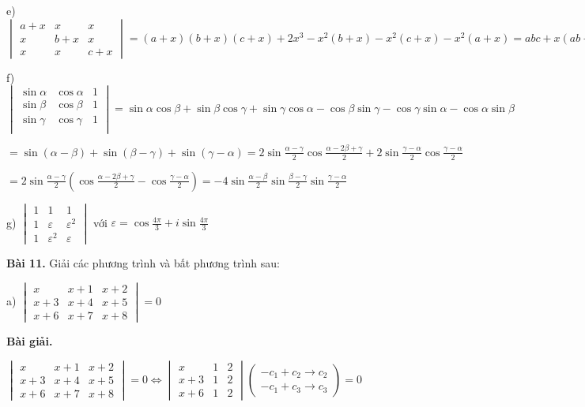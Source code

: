 \documentclass[12pt]{report}
\begin{document}
e) $\begin{vmatrix}
a+x & x & x \\
x & b+x & x \\
x & x & c+x
\end{vmatrix} = (a+x)(b+x)(c+x) + 2x^3 - x^2(b+x) - x^2(c+x) - x^2(a+x) = abc + x(ab + ac + bc)$

f) $\begin{vmatrix}
\sin \alpha & \cos \alpha & 1 \\
\sin \beta & \cos \beta & 1 \\
\sin \gamma & \cos \gamma & 1 \\
\end{vmatrix} =\sin\alpha\cos\beta+\sin\beta\cos\gamma+\sin\gamma\cos\alpha - \cos\beta\sin\gamma-\cos\gamma\sin\alpha-\cos\alpha\sin\beta$

$= \sin(\alpha - \beta) + \sin(\beta - \gamma) + \sin(\gamma - \alpha) = 2\sin \frac{\alpha - \gamma}{2} \cos \frac{\alpha - 2\beta + \gamma}{2} + 2\sin \frac{\gamma - \alpha}{2} \cos \frac{\gamma - \alpha}{2}$

$= 2 \sin \frac{\alpha - \gamma}{2}(\cos \frac{\alpha - 2\beta + \gamma}{2} - \cos \frac{\gamma - \alpha}{2}) = -4\sin \frac{\alpha - \beta}{2}\sin \frac{\beta-\gamma}{2}\sin \frac{\gamma-\alpha}{2}$

g) $\begin{vmatrix}
	1 & 1 & 1 \\
	1 & \varepsilon & \varepsilon^2 \\
	1 & \varepsilon^2 & \varepsilon
\end{vmatrix}$ với $\varepsilon = \cos \frac{4\pi}{3} + i\sin \frac{4\pi}{3}$

\textbf{Bài 11.} Giải các phương trình và bất phương trình sau: 

a) $\begin{vmatrix}
	x & x+1 & x+2 \\
	x+3 & x+4 & x+5 \\
	x+6 & x+7 & x+8
\end{vmatrix} = 0$

\textbf{Bài giải.}  

$\begin{vmatrix}
	x & x+1 & x+2 \\
	x+3 & x+4 & x+5 \\
	x+6 & x+7 & x+8
\end{vmatrix} = 0 \Leftrightarrow \begin{vmatrix}
x & 1 & 2 \\
x+3 & 1 & 2 \\
x+6 & 1 & 2
\end{vmatrix} \left( \begin{smallmatrix} -c_1 + c_2 \to c_2 \\ -c_1+c_3 \to c_3 \end{smallmatrix} \right) = 0$
\end{document}

